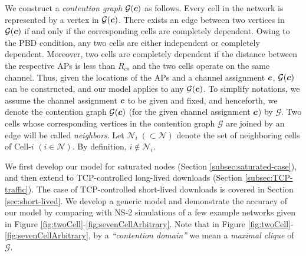 \documentclass[10pt,a4paper,journal]{IEEEtran}
\theoremstyle{definition}
\theoremstyle{remark}
\theoremstyle{plain}
\newcommand{\bmath}[1]{\mbox{\boldmath$#1$}}
\begin{document}
We construct a \textit{contention graph} $\mathcal{G}(\bmath{c})$ as follows. Every cell in the network is represented by a vertex in $\mathcal{G}(\bmath{c})$. There exists an edge between two vertices in $\mathcal{G}(\bmath{c})$ if and only if the corresponding cells are completely dependent. Owing to the PBD condition, any two cells are either independent or completely dependent. Moreover, two cells are completely dependent if the distance between the respective APs is less than $R_{cs}$ and the two cells operate on the same channel. Thus, given the locations of the APs and a channel assignment $\bmath{c}$, $\mathcal{G}(\bmath{c})$ can be constructed, and our model applies to any $\mathcal{G}(\bmath{c})$. To simplify notations, we assume the channel assignment $\bmath{c}$ to be given and fixed, and henceforth, we denote the contention graph $\mathcal{G}(\bmath{c})$ (for the given channel assignment $\bmath{c}$) by $\mathcal{G}$. Two cells whose corresponding vertices in the contention graph $\mathcal{G}$ are joined by an edge will be called \textit{neighbors}. Let $\mathcal{N}_i \; (\subset \mathcal{N})$ denote the set of neighboring cells of Cell-$i$ $(i \in \mathcal{N})$. By definition, $i \notin \mathcal{N}_i$.

We first develop our model for saturated nodes (Section \ref{subsec:saturated-case}), and then extend to TCP-controlled long-lived downloads (Section \ref{subsec:TCP-traffic}). The case of TCP-controlled short-lived downloads is covered in Section \ref{sec:short-lived}. We develop a generic model and demonstrate the accuracy of our model by comparing with NS-2 simulations of a few example networks given in Figure \ref{fig:twoCell}-\ref{fig:sevenCellArbitrary}. Note that in Figure \ref{fig:twoCell}-\ref{fig:sevenCellArbitrary}, by a \textit{``contention domain''} we mean a \textit{maximal clique} of $\mathcal{G}$. 
\end{document}
